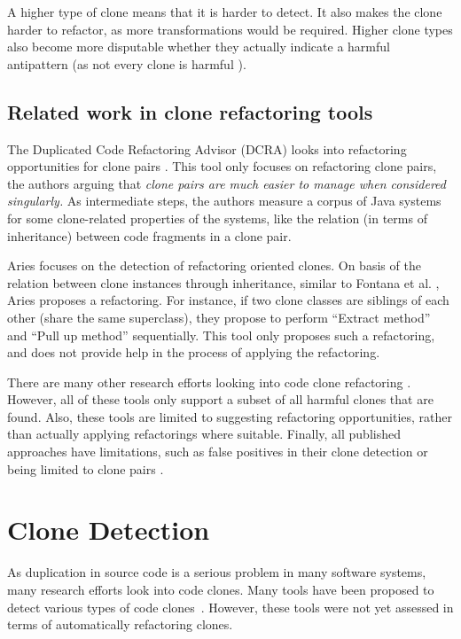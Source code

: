 \documentclass[a4paper]{article}
\begin{document}
A higher type of clone means that it is harder to detect. It also makes the clone harder to refactor, as more transformations would be required. Higher clone types also become more disputable whether they actually indicate a harmful antipattern (as not every clone is harmful \cite{jarzabek2010clones, kapser2008cloning}).
\subsection{Related work in clone refactoring tools}
The Duplicated Code Refactoring Advisor (DCRA) looks into refactoring opportunities for clone pairs \cite{fontana2012duplicated, fontana2015duplicated}. This tool only focuses on refactoring clone pairs, the authors arguing that \textit{clone pairs are much easier to manage when considered singularly.} As intermediate steps, the authors measure a corpus of Java systems for some clone-related properties of the systems, like the relation (in terms of inheritance) between code fragments in a clone pair.

Aries \cite{higo2004aries, higo2008metric} focuses on the detection of refactoring oriented clones. On basis of the relation between clone instances through inheritance, similar to Fontana et al. \cite{fontana2012duplicated}, Aries proposes a refactoring. For instance, if two clone classes are siblings of each other (share the same superclass), they propose to perform ``Extract method'' and ``Pull up method'' sequentially. This tool only proposes such a refactoring, and does not provide help in the process of applying the refactoring.

There are many other research efforts looking into code clone refactoring \cite{alwaqfi2017refactoring, chen2018clone, koni2001scenario}. However, all of these tools only support a subset of all harmful clones that are found. Also, these tools are limited to suggesting refactoring opportunities, rather than actually applying refactorings where suitable. Finally, all published approaches have limitations, such as false positives in their clone detection \cite{chen2018clone} or being limited to clone pairs \cite{higo2008metric}.

\section{Clone Detection}\label{chap:clonedetection}
As duplication in source code is a serious problem in many software systems, many research efforts look into code clones. Many tools have been proposed to detect various types of code clones~\cite{sheneamer2016survey, svajlenko2014evaluating}. However, these tools were not yet assessed in terms of automatically refactoring clones.
\end{document}
